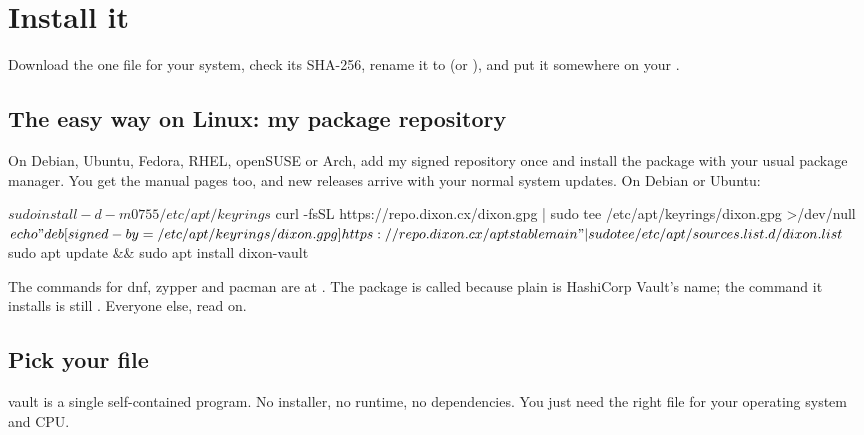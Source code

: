 \documentclass[10pt,oneside,openany]{book}
\begin{document}
\chapter{Install it}

\begin{tldr}
Download the one file for your system, check its SHA-256, rename it to
 (or ), and put it somewhere on your .
\end{tldr}

\section{The easy way on Linux: my package repository}

On Debian, Ubuntu, Fedora, RHEL, openSUSE or Arch, add my signed repository
once and install the  package with your usual package
manager. You get the manual pages too, and new releases arrive with your
normal system updates. On Debian or Ubuntu:

\begin{shell}
$ sudo install -d -m 0755 /etc/apt/keyrings
$ curl -fsSL https://repo.dixon.cx/dixon.gpg | sudo tee /etc/apt/keyrings/dixon.gpg >/dev/null
$ echo "deb [signed-by=/etc/apt/keyrings/dixon.gpg] https://repo.dixon.cx/apt stable main" |
    sudo tee /etc/apt/sources.list.d/dixon.list
$ sudo apt update && sudo apt install dixon-vault
\end{shell}

The commands for dnf, zypper and pacman are at . The
package is called  because plain  is HashiCorp
Vault's name; the command it installs is still . Everyone else,
read on.

\section{Pick your file}

vault is a single self-contained program. No installer, no runtime, no
dependencies. You just need the right file for your operating system and CPU.
\end{document}
